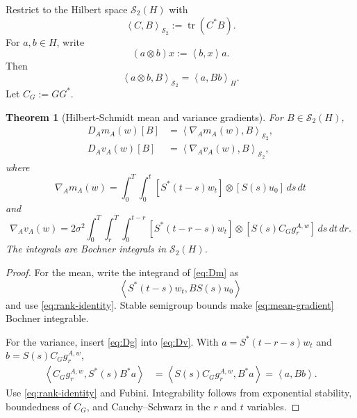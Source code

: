 \documentclass[11pt]{article}
\newtheorem{theorem}[assumption]{Theorem}
\theoremstyle{remark}
\newcommand{\HS}{\mathcal S_2}
\newcommand{\ip}[2]{\left\langle #1,#2\right\rangle}
\newcommand{\tr}{\operatorname{tr}}
\newcommand{\CG}{C_G}
\begin{document}
Restrict to the Hilbert space $\HS(H)$ with
\begin{equation}\label{eq:HS-inner}
 \ip{C}{B}_{\HS}:=\tr(C^*B).
\end{equation}
For $a,b\in H$, write
\begin{equation}\label{eq:rank-one}
 (a\otimes b)x:=\ip{b}{x}a.
\end{equation}
Then
\begin{equation}\label{eq:rank-identity}
 \ip{a\otimes b}{B}_{\HS}=\ip{a}{Bb}_H.
\end{equation}
Let $\CG:=GG^*$.

\begin{theorem}[Hilbert-Schmidt mean and variance gradients]\label{thm:HS-gradients}
For $B\in\HS(H)$,
\begin{align}
 D_Am_A(w)[B]
 &=\ip{\nabla_Am_A(w)}{B}_{\HS},
 \label{eq:mean-gradient-id}\\
 D_Av_A(w)[B]
 &=\ip{\nabla_Av_A(w)}{B}_{\HS},
 \label{eq:variance-gradient-id}
\end{align}
where
\begin{equation}\label{eq:mean-gradient}
 \nabla_Am_A(w)
 =
 \int_0^T\int_0^t
 [S^*(t-s)w_t]\otimes[S(s)u_0]
 \,ds\,dt
\end{equation}
and
\begin{equation}\label{eq:variance-gradient}
 \nabla_Av_A(w)
 =
 2\sigma^2
 \int_0^T\int_r^T\int_0^{t-r}
 [S^*(t-r-s)w_t]
 \otimes
 [S(s)\CG g_r^{A,w}]
 \,ds\,dt\,dr.
\end{equation}
The integrals are Bochner integrals in $\HS(H)$.
\end{theorem}

\begin{proof}
For the mean, write the integrand of \eqref{eq:Dm} as
\[
 \ip{S^*(t-s)w_t}{BS(s)u_0}
\]
and use \eqref{eq:rank-identity}. Stable semigroup bounds make \eqref{eq:mean-gradient} Bochner integrable.

For the variance, insert \eqref{eq:Dg} into \eqref{eq:Dv}. With
$a=S^*(t-r-s)w_t$ and $b=S(s)\CG g_r^{A,w}$,
\begin{align*}
 \ip{\CG g_r^{A,w}}{S^*(s)B^*a}
 &=\ip{S(s)\CG g_r^{A,w}}{B^*a}
 =\ip{a}{Bb}.
\end{align*}
Use \eqref{eq:rank-identity} and Fubini. Integrability follows from exponential stability, boundedness of $\CG$, and Cauchy--Schwarz in the $r$ and $t$ variables.
\end{proof}
\end{document}
